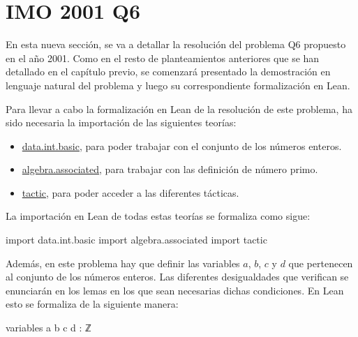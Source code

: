 \section{IMO 2001 Q6}

En esta nueva sección, se va a detallar la resolución del problema Q6
propuesto en el año 2001. Como en el resto de planteamientos anteriores
que se han detallado en el capítulo previo, se comenzará presentado la
demostración en lenguaje natural del problema y luego su correspondiente
formalización en Lean.

\noindent
{}

Para llevar a cabo la formalización en Lean de la resolución de este
problema, ha sido necesaria la importación de las siguientes teorías:
\begin{itemize}
\item
  \href{https://github.com/leanprover-community/mathlib/blob/master/src/data/int/basic.lean}{data.int.basic},
  para poder trabajar con el conjunto de los números enteros.
\item
  \href{https://github.com/leanprover-community/mathlib/blob/master/src/algebra/associated.lean}{algebra.associated},
  para trabajar con las definición de número primo.
\item
  \href{https://github.com/leanprover-community/mathlib/tree/master/src/tactic}{tactic},
  para poder acceder a las diferentes tácticas.
\end{itemize}

La importación en Lean de todas estas teorías se formaliza como sigue:
\begin{leancode}
import data.int.basic
import algebra.associated
import tactic
\end{leancode}

Además, en este problema hay que definir las variables \(a\), \(b\),
\(c\) y \(d\) que pertenecen al conjunto de los números enteros. Las
diferentes desigualdades que verifican se enunciarán en los lemas en los
que sean necesarias dichas condiciones. En Lean esto se formaliza de la
siguiente manera:
\begin{leancode}
variables {a b c d : ℤ}
\end{leancode}

